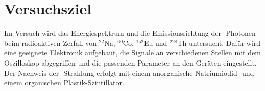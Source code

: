 \section{Versuchsziel}

Im Versuch wird das Energiespektrum und die Emissionsrichtung
der \textgamma-Photonen beim radioaktiven Zerfall von
${}^{22}$Na, ${}^{60}$Co, ${}^{152}$Eu und ${}^{228}$Th untersucht.
Dafür wird eine geeignete Elektronik aufgebaut, die Signale an verschiedenen Stellen
mit dem Oszilloskop abgegriffen und die passenden Parameter an den Geräten eingestellt.
Der Nachweis der \textgamma-Strahlung erfolgt mit einem anorganische Natriumiodid- und einem
organischen Plastik-Szintillator.